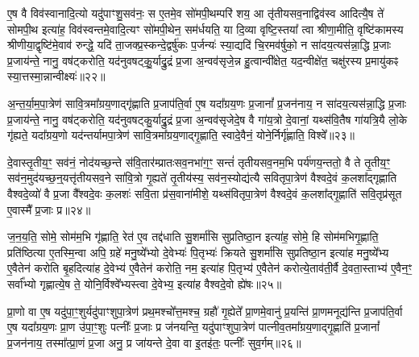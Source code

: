 ए॒ष वै विव॑स्वानादि॒त्यो यदु॑पाꣳशु॒सव॑नः॒ स ए॒तमे॒व सो॑मपी॒थम्परि॑ शय॒ आ तृ॑तीयसव॒नाद्विव॑स्व आदित्यै॒ष ते॑ सोमपी॒थ इत्या॑ह॒ विव॑स्वन्तमे॒वादि॒त्यꣳ सो॑मपी॒थेन॒ सम॑र्धयति॒ या दि॒व्या वृष्टि॒स्तया᳚ त्वा श्रीणा॒मीति॒ वृष्टि॑कामस्य श्रीणीया॒द्वृष्टि॑मे॒वाव॑ रुन्द्धे॒ यदि॑ ता॒जक्प्र॒स्कन्दे॒द्वर्\mbox{}षु॑कः प॒र्जन्यः॑ स्या॒द्यदि॑ चि॒रमव॑र्\mbox{}षुको॒ न सा॑दय॒त्यस॑न्ना॒द्धि प्र॒जाः प्र॒जाय॑न्ते॒ नानु॒ वष॑ट्करोति॒ यद॑नुवषट्कु॒॒र्याद्रु॒द्रं प्र॒जा अ॒न्वव॑सृजे॒न्न हु॒त्वान्वी᳚क्षेत॒ यद॒न्वीक्षे॑त॒ चक्षु॑रस्य प्र॒मायु॑कꣴ स्या॒त्तस्मा॒न्नान्वीक्ष्यः॑॥२२॥

{\anuvakamend[{ए॒व य॒ज्ञाज्ज॒रायु॒ तदे॒व तद॒न्तर्द॑धाति॒ न स॒प्तविꣳ॑शतिश्च॥६॥}]}

अ॒न्त॒र्या॒म॒पा॒त्रेण॑ सावि॒त्रमा᳚ग्रय॒णाद्गृ॑ह्णाति प्र॒जाप॑ति॒र्वा ए॒ष यदा᳚ग्रय॒णः प्र॒जानां᳚ प्र॒जन॑नाय॒ न सा॑दय॒त्यस॑न्ना॒द्धि प्र॒जाः प्र॒जाय॑न्ते॒ नानु॒ वष॑ट्करोति॒ यद॑नुवषट्कु॒र्याद्रु॒द्रं प्र॒जा अ॒न्वव॑सृजेदे॒ष वै गा॑य॒त्रो दे॒वानां॒ यथ्स॑वि॒तैष गा॑यत्रि॒यै लो॒के गृ॑ह्यते॒ यदा᳚ग्रय॒णो यद॑न्तर्यामपा॒त्रेण॑ सावि॒त्रमा᳚ग्रय॒णाद्गृ॒ह्णाति॒ स्वादे॒वैनं॒ योने॒र्निर्गृ॑ह्णाति॒ विश्वे᳚॥२३॥

दे॒वास्तृ॒तीय॒ꣳ॒ सव॑नं॒ नोद॑यच्छ॒न्ते स॑वि॒तार॑म्प्रातःसव॒नभा॑ग॒ꣳ॒ सन्तं॑ तृतीयसव॒नम॒भि पर्य॑णय॒न्ततो॒ वै ते तृ॒तीय॒ꣳ॒ सव॑न॒मुद॑यच्छ॒न्॒यत्तृ॑तीयसव॒ने सा॑वि॒त्रो गृ॒ह्यते॑ तृ॒तीय॑स्य॒ सव॑न॒स्योद्य॑त्यै सवितृपा॒त्रेण॑ वैश्वदे॒वं क॒लशा᳚द्गृह्णाति वैश्वदे॒व्यो॑ वै प्र॒जा वै᳚श्वदे॒वः क॒लशः॑ सवि॒ता प्र॑स॒वाना॑मीशे॒ यथ्स॑वितृपा॒त्रेण॑ वैश्वदे॒वं क॒लशा᳚द्गृ॒ह्णाति॑ सवि॒तृप्र॑सूत ए॒वास्मै᳚ प्र॒जाः प्र॥२४॥

ज॒न॒य॒ति॒ सोमे॒ सोम॑म॒भि गृ॑ह्णाति॒ रेत॑ ए॒व तद्द॑धाति सु॒शर्मा॑सि सुप्रतिष्ठा॒न इत्या॑ह॒ सोमे॒ हि सोम॑मभिगृ॒ह्णाति॒ प्रति॑ष्ठित्या ए॒तस्मि॒न्वा अपि॒ ग्रहे॑ मनु॒ष्ये᳚भ्यो दे॒वेभ्यः॑ पि॒तृभ्यः॑ क्रियते सु॒शर्मा॑सि सुप्रतिष्ठा॒न इत्या॑ह मनु॒ष्ये᳚भ्य ए॒वैतेन॑ करोति बृ॒हदित्या॑ह दे॒वेभ्य॑ ए॒वैतेन॑ करोति॒ नम॒ इत्या॑ह पि॒तृभ्य॑ ए॒वैतेन॑ करोत्ये॒ताव॑ती॒र्वै दे॒वता॒स्ताभ्य॑ ए॒वैन॒ꣳ॒ सर्वा᳚भ्यो गृह्णात्ये॒ष ते॒ योनि॒र्विश्वे᳚भ्यस्त्वा दे॒वेभ्य॒ इत्या॑ह वैश्वदे॒वो ह्ये॑षः॥२५॥

{\anuvakamend[{विश्वे॒ प्र पि॒तृभ्य॑ ए॒वैतेन॑ करो॒त्येका॒न्नविꣳ॑श॒तिश्च॑॥७॥}]}

प्रा॒णो वा ए॒ष यदु॑पा॒ꣳ॒शुर्यदु॑पाꣳशुपा॒त्रेण॑ प्रथ॒मश्चो᳚त्त॒मश्च॒ ग्रहौ॑ गृ॒ह्येते᳚ प्रा॒णमे॒वानु॑ प्र॒यन्ति॑ प्रा॒णमनूद्य॑न्ति प्र॒जाप॑ति॒र्वा ए॒ष यदा᳚ग्रय॒णः प्रा॒ण उ॑पा॒ꣳ॒शुः पत्नीः᳚ प्र॒जाः प्र ज॑नयन्ति॒ यदु॑पाꣳशुपा॒त्रेण॑ पात्नीव॒तमा᳚ग्रय॒णाद्गृ॒ह्णाति॑ प्र॒जानां᳚ प्र॒जन॑नाय॒ तस्मा᳚त्प्रा॒णं प्र॒जा अनु॒ प्र जा॑यन्ते दे॒वा वा इ॒तइ॑तः॒ पत्नीः᳚ सुव॒र्गम्॥२६॥

